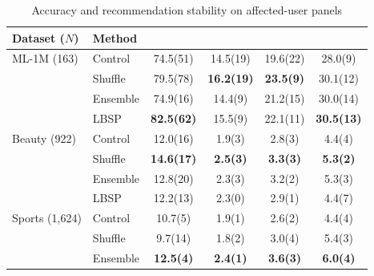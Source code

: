 \begin{table}[!htbp]
\centering
\caption{Accuracy and recommendation stability on affected-user panels}
\label{tab:four-methods}
\fontsize{8.5}{11}\selectfont
\setlength{\tabcolsep}{2.5pt}
\renewcommand{\arraystretch}{1.12}
\par\smallskip\noindent{}\par\smallskip
\noindent\begin{tabular*}{\textwidth}{@{\extracolsep{\fill}}llS[table-format=2.1(3)]S[table-format=2.1(3)]S[table-format=2.1(3)]S[table-format=2.1(3)]@{}}
\toprule
{Dataset ($N$)} & Method & {} & {} & {} & {}\\
\midrule
ML-1M (163) & Control & 74.5(51) & 14.5(19) & 19.6(22) & 28.0(9)\\ %
 & Shuffle & 79.5(78) & \bfseries 16.2(19) & \bfseries 23.5(9) & 30.1(12)\\ %
 & Ensemble & 74.9(16) & 14.4(9) & 21.2(15) & 30.0(14)\\ %
 & LBSP & \bfseries 82.5(62) & 15.5(9) & 22.1(11) & \bfseries 30.5(13)\\ %
\midrule
Beauty (922) & Control & 12.0(16) & 1.9(3) & 2.8(3) & 4.4(4)\\ %
 & Shuffle & \bfseries 14.6(17) & \bfseries 2.5(3) & \bfseries 3.3(3) & \bfseries 5.3(2)\\ %
 & Ensemble & 12.8(20) & 2.3(3) & 3.2(2) & 5.3(3)\\ %
 & LBSP & 12.2(13) & 2.3(0) & 2.9(1) & 4.4(7)\\ %
\midrule
Sports (1,624) & Control & 10.7(5) & 1.9(1) & 2.6(2) & 4.4(4)\\ %
 & Shuffle & 9.7(14) & 1.8(2) & 3.0(4) & 5.4(3)\\ %
 & Ensemble & \bfseries 12.5(4) & \bfseries 2.4(1) & \bfseries 3.6(3) & \bfseries 6.0(4)\\ %

\end{tabular*}
\end{table}
